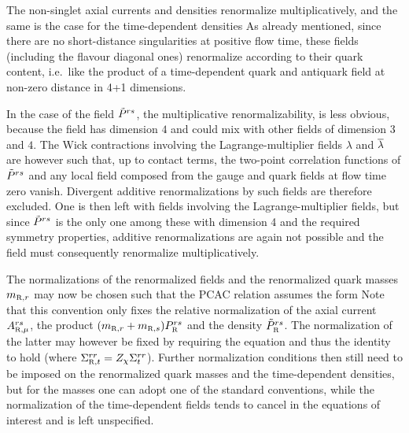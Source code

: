 The
non-singlet axial currents and densities
renormalize multiplicatively,
and the same is the case for the time-dependent densities
As already mentioned, since there are
no short-distance singularities at positive flow time,
these fields (including the flavour diagonal
ones) renormalize according to their quark content, i.e.~like 
the product of a time-dependent quark and antiquark field at non-zero 
distance in 4+1 dimensions.

In the case of the field $\tilde{P}^{rs}$,
the multiplicative renormalizability,
is less obvious,
because the field has dimension $4$ and could mix
with other fields of dimension $3$ and $4$.
The Wick contractions involving the
Lagrange-multiplier fields $\lambda$ and $\overline{\lambda}$ 
are however such that, up to contact terms,
the two-point correlation functions of
$\tilde{P}^{rs}$ and any local 
field composed from the gauge and quark fields 
at flow time zero vanish. 
Divergent additive renormalizations by such fields are therefore
excluded. One is then left with
fields involving the Lagrange-multiplier fields, but 
since $\tilde{P}^{rs}$ is the only one among these with
dimension 4 and the required symmetry properties,
additive renormalizations are again not possible
and the field must consequently renormalize multiplicatively.

The normalizations of the renormalized fields and 
the renormalized quark masses $\mR{r}$ may now be chosen such that
the PCAC relation assumes the form
Note that this convention only fixes the relative normalization of 
the axial current $\rens{\Aax}{\mu}^{rs}$, the product
$(\mR{r}+\mR{s})\ren{\Pax}^{rs}$ and the density $\ren{\Ptax}^{rs}$.
The normalization of the latter may however
be fixed by requiring the equation
and thus the identity
to hold (where $\rens{\Sigma}{t}^{rr}=Z_{\chi}\Sigma_t^{rr}$).
Further normalization conditions then still need to be imposed
on the renormalized 
quark masses and the time-dependent densities, but for the masses
one can adopt one of the standard conventions, while the normalization of
the time-dependent fields tends to cancel in the equations of interest 
and is left unspecified.

